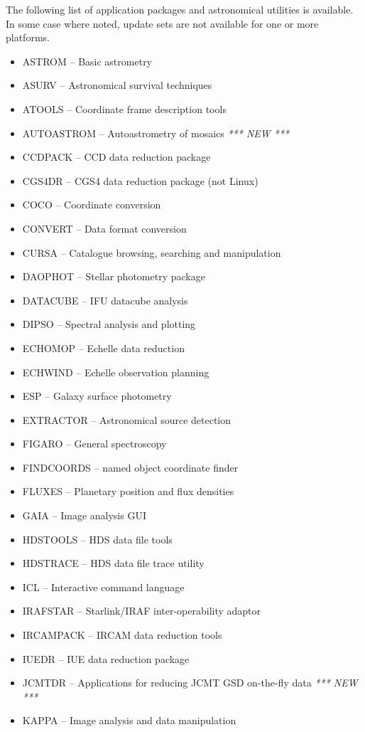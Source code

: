 \documentclass[twoside,11pt]{article}
\renewcommand{\_}{\texttt{\symbol{95}}}
\begin{document}
The following list of application packages and astronomical utilities
is available.  In some case where noted, update sets are not available for 
one or more platforms.  
\begin{itemize}
\item ASTROM -- Basic astrometry
\item ASURV -- Astronomical survival techniques
\item ATOOLS -- Coordinate frame description tools
\item AUTOASTROM -- Autoastrometry of mosaics \hfill \emph{*** NEW ***}
\item CCDPACK -- CCD data reduction package
\item CGS4DR -- CGS4 data reduction package (not Linux)
\item COCO -- Coordinate conversion
\item CONVERT -- Data format conversion
\item CURSA -- Catalogue browsing, searching  and manipulation
\item DAOPHOT -- Stellar photometry package
\item DATACUBE -- IFU datacube analysis
\item DIPSO -- Spectral analysis and plotting
\item ECHOMOP -- Echelle data reduction
\item ECHWIND -- Echelle observation planning
\item ESP -- Galaxy surface photometry
\item EXTRACTOR -- Astronomical source detection
\item FIGARO -- General spectroscopy
\item FINDCOORDS -- named object coordinate finder
\item FLUXES -- Planetary position and flux densities
\item GAIA -- Image analysis GUI
\item HDSTOOLS -- HDS data file tools
\item HDSTRACE -- HDS data file trace utility
\item ICL -- Interactive command language
\item IRAFSTAR -- Starlink/IRAF inter-operability adaptor
\item IRCAMPACK -- IRCAM data reduction tools
\item IUEDR -- IUE data reduction package
\item JCMTDR -- Applications for reducing JCMT GSD on-the-fly data \hfill \emph{*** NEW ***}
\item KAPPA -- Image analysis and data manipulation

\end{itemize}
\end{document}
